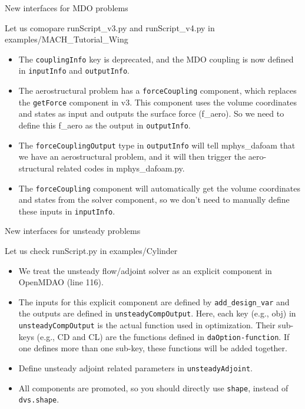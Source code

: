 \documentclass{bredelebeamer}
\begin{document}
\begin{frame}{New interfaces for MDO problems}

  Let us comopare runScript\_v3.py and runScript\_v4.py in examples/MACH\_Tutorial\_Wing
  
  \begin{itemize}
  
    \item The \texttt{couplingInfo} key is deprecated, and the MDO coupling is now defined in \texttt{inputInfo} and \texttt{outputInfo}.
    \item The aerostructural problem has a \texttt{forceCoupling} component, which replaces the \texttt{getForce} component in v3. This component uses the volume coordinates and states as input and outputs the surface force (f\_aero). So we need to define this f\_aero as the output in \texttt{outputInfo}. 
    \item The \texttt{forceCouplingOutput} type in \texttt{outputInfo} will tell mphys\_dafoam that we have an aerostructural problem, and it will then trigger the aero-structural related codes in mphys\_dafoam.py.
    \item The \texttt{forceCoupling} component will automatically get the volume coordinates and states from the solver component, so we don't need to manually define these inputs in \texttt{inputInfo}.
    
    
\end{itemize}
\end{frame}

\begin{frame}{New interfaces for unsteady problems}

   Let us check runScript.py in examples/Cylinder
  
  \begin{itemize}
  \item We treat the unsteady flow/adjoint solver as an explicit component in OpenMDAO (line 116).
  \item The inputs for this explicit component are defined by \texttt{add\_design\_var} and the outputs are defined in \texttt{unsteadyCompOutput}. Here, each key (e.g., obj) in \texttt{unsteadyCompOutput} is the actual function used in optimization. Their sub-keys (e.g., CD and CL) are the functions defined in \texttt{daOption-function}. If one defines more than one sub-key, these functions will be added together.  
   \item Define unsteady adjoint related parameters in \texttt{unsteadyAdjoint}.
   \item All components are promoted, so you should directly use \texttt{shape}, instead of \texttt{dvs.shape}.
    
\end{itemize}
\end{frame}
\end{document}
